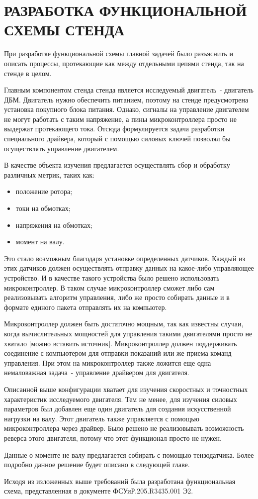 \section{РАЗРАБОТКА ФУНКЦИОНАЛЬНОЙ СХЕМЫ СТЕНДА}

При разработке функциональной схемы главной задачей было разъяснить и описать
процессы, протекающие как между отдельными цепями стенда, так на стенде в целом.

Главным компонентом стенда стенда является исследуемый двигатель~- двигатель ДБМ. Двигатель нужно
обеспечить питанием, поэтому на стенде предусмотрена установка покупного блока питания.
Однако, сигналы на управление двигателем не могут работать с таким напряжение, а
пины микроконтроллера просто не выдержат протекающего тока. Отсюда формулируется
задача разработки специального драйвера, который с помощью силовых ключей позволял бы
осуществлять управление двигателем.

В качестве объекта изучения предлагается осуществлять сбор и обработку различных метрик, таких как:
\begin{itemize}
  \item положение ротора;
  \item токи на обмотках;
  \item напряжения на обмотках;
  \item момент на валу.
\end{itemize}

Это стало возможным благодаря установке определенных датчиков. Каждый из этих датчиков
должен осуществлять отправку данных на какое-либо управляющее устройство. И в качестве такого
устройства было решено использовать микроконтроллер. В таком случае микроконтроллер сможет
либо сам реализовывать алгоритм управления, либо же просто собирать данные и в формате 
единого пакета отправлять их на компьютер.

Микроконтроллер должен быть достаточно мощным, так как известны случаи, когда вычислительных
мощностей для управления такими двигателями просто не хватало [можно вставить источник]. 
Микроконтроллер должен поддерживать соединение с компьютером для отправки показаний или же
приема команд управления.
При этом на микроконтроллер также ложится еще одна немаловажная задача~- управление драйвером
для двигателя.

Описанной выше конфигурации хватает для изучения скоростных и точностных характеристик исследуемого
двигателя. Тем не менее, для изучения силовых параметров был добавлен еще один двигатель
для создания искусственной нагрузки на валу. Этот двигатель также управляется
с помощью микроконтроллера через драйвер. Было решено не реализовывать возможность реверса этого
двигателя, потому что этот функционал просто не нужен. 

Данные о моменте не валу предлагается собирать с помощью тензодатчика. Более подробно
данное решение будет описано в следующей главе.

Исходя из изложенных выше требований была разработана функциональная схема, представленная в
документе ФСУиР.205.R3435.001 Э2. 